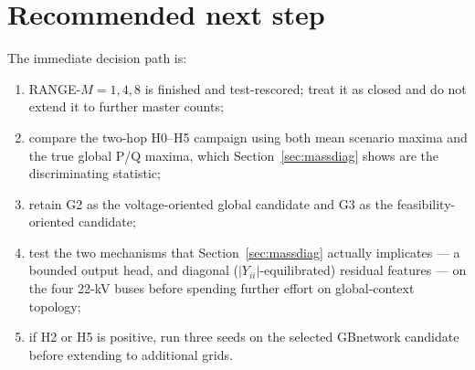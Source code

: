 \documentclass[10pt]{article}
\begin{document}
\section{Recommended next step}

The immediate decision path is:
\begin{enumerate}
\item RANGE-$M=1,4,8$ is finished and test-rescored; treat it as closed and do
      not extend it to further master counts;
\item compare the two-hop H0--H5 campaign using both mean scenario maxima and
      the true global P/Q maxima, which Section~\ref{sec:massdiag} shows are the
      discriminating statistic;
\item retain G2 as the voltage-oriented global candidate and G3 as the
      feasibility-oriented candidate;
\item test the two mechanisms that Section~\ref{sec:massdiag} actually
      implicates --- a bounded output head, and diagonal
      ($|Y_{ii}|$-equilibrated) residual features --- on the four 22-kV buses
      before spending further effort on global-context topology;
\item if H2 or H5 is positive, run three seeds on the selected GBnetwork
      candidate before extending to additional grids.
\end{enumerate}
\end{document}
